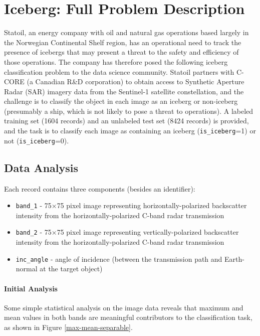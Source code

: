 \documentclass[fleqn,10pt]{SelfArx} %
\begin{document}
\section{Iceberg: Full Problem Description}

Statoil, an energy company with oil and natural gas operations based largely in the Norwegian Continental Shelf region, has an operational need to track the presence of icebergs that may present a threat to the safety and efficiency of those operations. \cite{statoil} The company has therefore posed the following iceberg classification problem to the data science community.  Statoil partners with C-CORE (a Canadian R\&D corporation) to obtain access to Synthetic Aperture Radar (SAR) imagery data from the Sentinel-1 satellite constellation, and the challenge is to classify the object in each image as an iceberg or non-iceberg (presumably a ship, which is not likely to pose a threat to operations). A labeled training set (1604 records) and an unlabeled test set (8424 records) is provided, and the task is to classify each image as containing an iceberg (\texttt{is\_iceberg}=1) or not (\texttt{is\_iceberg}=0). \cite{kaggle-ice}

\subsection{Data Analysis}
Each record contains three components (besides an identifier):

\begin{itemize}
	\item \texttt{band\_1} - 75$\times$75 pixel image representing horizontally-polarized backscatter intensity from the horizontally-polarized C-band radar transmission
	\item \texttt{band\_2} - 75$\times$75 pixel image representing vertically-polarized backscatter intensity from the horizontally-polarized C-band radar transmission
	\item \texttt{inc\_angle} - angle of incidence (between the transmission path and Earth-normal at the target object)
\end{itemize}

\paragraph{Initial Analysis} Some simple statistical analysis on the image data reveals that maximum and mean values in both bands are meaningful contributors to the classification task, as shown in Figure \ref{max-mean-separable}.
\end{document}
